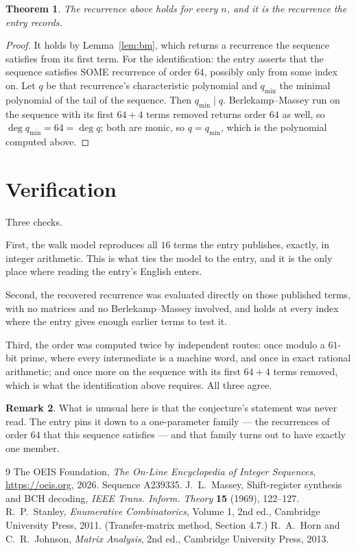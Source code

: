 \documentclass[11pt,a4paper]{article}
\theoremstyle{plain}
\newtheorem{theorem}{Theorem}
\theoremstyle{definition}
\newtheorem{remark}[theorem]{Remark}
\begin{document}
\begin{theorem}
The recurrence above holds for every $n$, and it is the recurrence the entry records.
\end{theorem}

\begin{proof}
It holds by Lemma~\ref{lem:bm}, which returns a recurrence the sequence satisfies from its
first term. For the identification: the entry asserts that the sequence satisfies SOME
recurrence of order $64$, possibly only from some index on. Let $q$ be that recurrence's
characteristic polynomial and $q_{\min}$ the minimal polynomial of the tail of the sequence.
Then $q_{\min}\mid q$. Berlekamp--Massey run on the sequence with its first $64+4$ terms
removed returns order $64$ as well, so $\deg q_{\min}=64=\deg q$; both are monic, so
$q=q_{\min}$, which is the polynomial computed above.
\end{proof}

\section{Verification}

Three checks.

First, the walk model reproduces all $16$ terms the entry publishes, exactly, in integer
arithmetic. This is what ties the model to the entry, and it is the only place where reading
the entry's English enters.

Second, the recovered recurrence was evaluated directly on those published terms, with no
matrices and no Berlekamp--Massey involved, and holds at every index where the entry gives
enough earlier terms to test it.

Third, the order was computed twice by independent routes: once modulo a $61$-bit prime, where
every intermediate is a machine word, and once in exact rational arithmetic; and once more on
the sequence with its first $64+4$ terms removed, which is what the identification above
requires. All three agree.

\begin{remark}
What is unusual here is that the conjecture's statement was never read. The entry pins it down
to a one-parameter family --- the recurrences of order $64$ that this sequence satisfies
--- and that family turns out to have exactly one member.
\end{remark}

\begin{thebibliography}{9}
 The OEIS Foundation, \emph{The On-Line Encyclopedia of Integer
Sequences}, \url{https://oeis.org}, 2026. Sequence A239335.
 J.~L.~Massey, Shift-register synthesis and BCH decoding, \emph{IEEE
Trans. Inform. Theory} \textbf{15} (1969), 122--127.
 R.~P.~Stanley, \emph{Enumerative Combinatorics}, Volume 1, 2nd ed.,
Cambridge University Press, 2011. (Transfer-matrix method, Section 4.7.)
 R.~A.~Horn and C.~R.~Johnson, \emph{Matrix Analysis}, 2nd ed., Cambridge
University Press, 2013.
\end{thebibliography}
\end{document}
